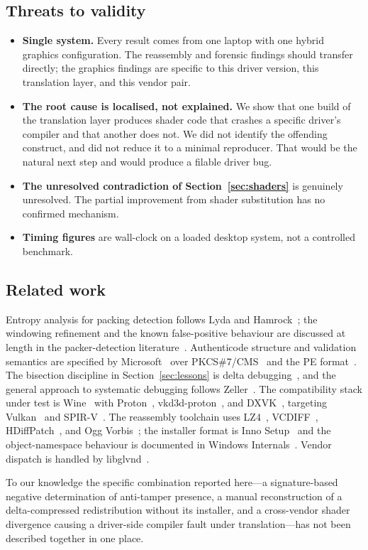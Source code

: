 \subsection{Threats to validity}

\begin{itemize}
\item \textbf{Single system.} Every result comes from one laptop with one hybrid
      graphics configuration. The reassembly and forensic findings should
      transfer directly; the graphics findings are specific to this driver
      version, this translation layer, and this vendor pair.
\item \textbf{The root cause is localised, not explained.} We show that one build
      of the translation layer produces shader code that crashes a specific
      driver's compiler and that another does not. We did not identify the
      offending construct, and did not reduce it to a minimal reproducer. That
      would be the natural next step and would produce a filable driver bug.
\item \textbf{The unresolved contradiction of Section~\ref{sec:shaders}} is
      genuinely unresolved. The partial improvement from shader substitution has
      no confirmed mechanism.
\item \textbf{Timing figures} are wall-clock on a loaded desktop system, not a
      controlled benchmark.
\end{itemize}

\subsection{Related work}

Entropy analysis for packing detection follows Lyda and
Hamrock~\cite{lyda2007}; the windowing refinement and the known false-positive
behaviour are discussed at length in the packer-detection
literature~\cite{sokpacker}. Authenticode structure and validation semantics
are specified by Microsoft~\cite{authenticode} over PKCS\#7/CMS~\cite{rfc5652}
and the PE format~\cite{pecoff}. The bisection discipline in
Section~\ref{sec:lessons} is delta debugging~\cite{zeller2002}, and the general
approach to systematic debugging follows Zeller~\cite{zellerbook}. The
compatibility stack under test is Wine~\cite{wine} with Proton~\cite{proton},
vkd3d-proton~\cite{vkd3d}, and DXVK~\cite{dxvk}, targeting
Vulkan~\cite{vulkan} and SPIR-V~\cite{spirv}. The reassembly toolchain uses
LZ4~\cite{lz4}, VCDIFF~\cite{rfc3284}, HDiffPatch~\cite{hdiffpatch}, and Ogg
Vorbis~\cite{vorbis}; the installer format is Inno Setup~\cite{innosetup} and
the object-namespace behaviour is documented in Windows
Internals~\cite{ntobj}. Vendor dispatch is handled by libglvnd~\cite{glvnd}.

To our knowledge the specific combination reported here---a signature-based
negative determination of anti-tamper presence, a manual reconstruction of a
delta-compressed redistribution without its installer, and a cross-vendor shader
divergence causing a driver-side compiler fault under translation---has not been
described together in one place.
